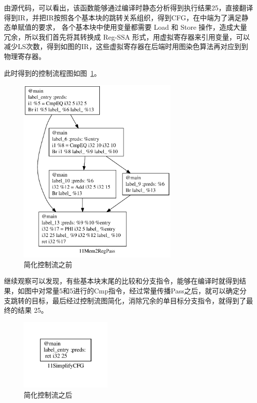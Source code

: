 由源代码，可以看出，该函数能够通过编译时静态分析得到执行结果25，直接翻译得到IR，并把IR按照各个基本块的跳转关系组织，得到CFG，在中端为了满足静态单赋值的要求， 各个基本块中使用变量都需要 Load 和 Store 操作，造成大量冗余，所以我们首先将其转换成 Reg-SSA 形式，用虚拟寄存器来引用变量，可以减少LS次数，得到如图的IR，这些虚拟寄存器在后端时用图染色算法再对应到到物理寄存器。


此时得到的控制流程图如图~\ref{fig:cfg0}。




\begin{figure}[htb]
  \centering
  \includegraphics[width=0.7\textwidth]{figures/cfgsimplify0.pdf}
  \caption{简化控制流之前}
  \label{fig:cfg0}
\end{figure}

继续观察可以发现，有些基本块末尾的比较和分支指令，能够在编译时就得到结果，如图中对常量5和5进行的Cmp指令，经过常量传播Pass之后，就可以确定分支跳转的目标，最后经过控制流图简化，消除冗余的单目标分支指令，就得到了最终的结果 25。

\begin{figure}[htb]
  \centering
  \includegraphics[width=0.4\textwidth]{figures/cfgsimplify1.pdf}
  \caption{简化控制流之后}
  \label{fig:cfg1}
\end{figure}
